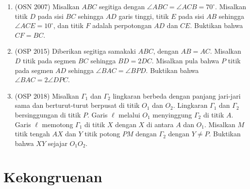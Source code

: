 \documentclass[12pt]{scrartcl}
\begin{document}
\begin{enumerate}

	\item (OSN 2007)
	Misalkan $ABC$ segitiga dengan $\angle ABC=\angle ACB=70^{\circ}$. Misalkan titik $D$ pada sisi $BC$ sehingga $AD$ garis tinggi, titik $E$ pada sisi $AB$ sehingga $\angle ACE=10^{\circ}$, dan titik $F$ adalah perpotongan $AD$ dan $CE$. Buktikan bahwa $CF=BC.$

	\item (OSP 2015)
	Diberikan segitiga samakaki $ABC$, dengan $AB=AC$. Misalkan $D$ titik pada segmen $BC$ sehingga $BD=2DC$. Misalkan pula bahwa $P$ titik pada segmen $AD$ sehingga $\angle BAC=\angle BPD$. Buktikan bahwa $\angle BAC=2\angle DPC$.

	\item (OSP 2018)
	Misalkan $\Gamma_1$ dan $\Gamma_2$ lingkaran berbeda dengan panjang jari-jari sama dan berturut-turut berpusat di titik $O_1$ dan $O_2$. Lingkaran $\Gamma_1$ dan $\Gamma_2$ bersinggungan di titik $P$. Garis $\ell$ melalui $O_1$ menyinggung $\Gamma_2$ di titik $A$. Garis $\ell$ memotong $\Gamma_1$ di titik $X$ dengan $X$ di antara $A$ dan $O_1$. Misalkan $M$ titik tengah $AX$ dan $Y$ titik potong $PM$ dengan $\Gamma_2$ dengan $Y \neq P$. Buktikan bahwa $XY$ sejajar $O_1O_2$.

\end{enumerate}

\section{Kekongruenan}
\end{document}
